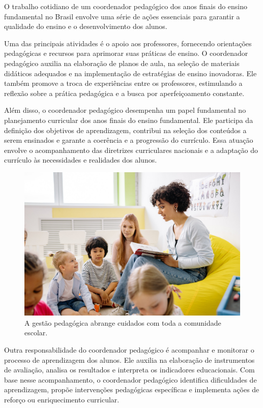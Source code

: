 O trabalho cotidiano de um coordenador pedagógico dos anos finais do ensino fundamental no Brasil envolve uma série de ações essenciais para garantir a qualidade do ensino e o desenvolvimento dos alunos.

Uma das principais atividades é o apoio aos professores, fornecendo orientações pedagógicas e recursos para aprimorar suas práticas de ensino. O coordenador pedagógico auxilia na elaboração de planos de aula, na seleção de materiais didáticos adequados e na implementação de estratégias de ensino inovadoras. Ele também promove a troca de experiências entre os professores, estimulando a reflexão sobre a prática pedagógica e a busca por aperfeiçoamento constante.

Além disso, o coordenador pedagógico desempenha um papel fundamental no planejamento curricular dos anos finais do ensino fundamental. Ele participa da definição dos objetivos de aprendizagem, contribui na seleção dos conteúdos a serem ensinados e garante a coerência e a progressão do currículo. Essa atuação envolve o acompanhamento das diretrizes curriculares nacionais e a adaptação do currículo às necessidades e realidades dos alunos.

\begin{figure}[t]
\centering
\includegraphics[width=\textwidth]{./imgs/Imagem003.jpg}
\caption{A gestão pedagógica abrange cuidados com toda a comunidade
escolar.}
\end{figure}

Outra responsabilidade do coordenador pedagógico é acompanhar e monitorar o processo de aprendizagem dos alunos. Ele auxilia na elaboração de instrumentos de avaliação, analisa os resultados e interpreta os indicadores educacionais. Com base nesse acompanhamento, o coordenador pedagógico identifica dificuldades de aprendizagem, propõe intervenções pedagógicas específicas e implementa ações de reforço ou enriquecimento curricular.

